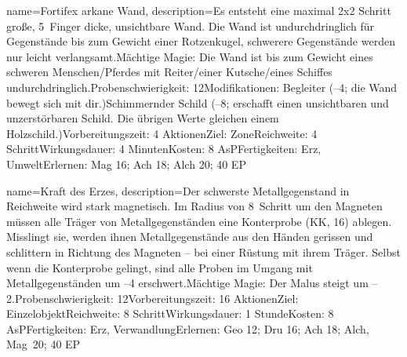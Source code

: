 {
    name={Fortifex arkane Wand},
    description={Es entsteht eine maximal 2x2 Schritt große, 5 Finger dicke, unsichtbare Wand. Die Wand ist undurchdringlich für Gegenstände bis zum Gewicht einer Rotzenkugel, schwerere Gegenstände werden nur leicht verlangsamt.\newline Mächtige Magie: Die Wand ist bis zum Gewicht eines schweren Menschen/Pferdes mit Reiter/einer Kutsche/eines Schiffes undurchdringlich.\newline Probenschwierigkeit: 12\newline Modifikationen: Begleiter (–4; die Wand bewegt sich mit dir.)\newline Schimmernder Schild (–8; erschafft einen unsichtbaren und unzerstörbaren Schild. Die übrigen Werte gleichen einem Holzschild.)\newline Vorbereitungszeit: 4 Aktionen\newline Ziel: Zone\newline Reichweite: 4 Schritt\newline Wirkungsdauer: 4 Minuten\newline Kosten: 8 AsP\newline Fertigkeiten: Erz, Umwelt\newline Erlernen: Mag 16; Ach 18; Alch 20; 40 EP}
}


{
    name={Kraft des Erzes},
    description={Der schwerste Metallgegenstand in Reichweite wird stark magnetisch. Im Radius von 8 Schritt um den Magneten müssen alle Träger von Metallgegenständen eine Konterprobe (KK, 16) ablegen. Misslingt sie, werden ihnen Metallgegenstände aus den Händen gerissen und schlittern in Richtung des Magneten – bei einer Rüstung mit ihrem Träger. Selbst wenn die Konterprobe gelingt, sind alle Proben im Umgang mit Metallgegenständen um –4 erschwert.\newline Mächtige Magie: Der Malus steigt um –2.\newline Probenschwierigkeit: 12\newline Vorbereitungszeit: 16 Aktionen\newline Ziel: Einzelobjekt\newline Reichweite: 8 Schritt\newline Wirkungsdauer: 1 Stunde\newline Kosten: 8 AsP\newline Fertigkeiten: Erz, Verwandlung\newline Erlernen: Geo 12; Dru 16; Ach 18; Alch, Mag 20; 40 EP}
}


